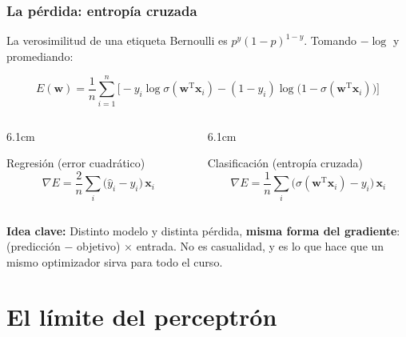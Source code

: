 \documentclass[aspectratio=169, 10pt]{beamer}
\newcommand{\formula}[1]{%
	\begin{tcolorbox}[colback=UCMBlue!8, colframe=UCMBlue, arc=4pt,
		boxsep=2pt, left=6pt, right=6pt, top=3pt, bottom=3pt]
		#1
	\end{tcolorbox}
}
\newcommand{\idea}[1]{%
	\begin{tcolorbox}[colback=AccentGreen!6, colframe=AccentGreen, arc=3pt,
		width=\textwidth, boxsep=1pt, left=5pt, right=5pt, top=2pt, bottom=2pt,
		fontupper=\small]
		\RaggedRight\textbf{Idea clave:} #1
	\end{tcolorbox}
}
\begin{document}
\begin{frame}
\frametitle{La pérdida: entropía cruzada}
La verosimilitud de una etiqueta Bernoulli es $p^{y}(1-p)^{1-y}$. Tomando $-\log$ y promediando:
\formula{
\[
E(\mathbf w) = \frac{1}{n}\sum_{i=1}^{n}
\Big[-y_i \log \sigma(\mathbf w^{\mathrm{T}}\mathbf x_i) - (1-y_i)\log\big(1-\sigma(\mathbf w^{\mathrm{T}}\mathbf x_i)\big)\Big]
\]}
\pause
\begin{columns}[T]
\begin{column}{6.1cm}
\begin{block}{Regresión (error cuadrático)}
\[
\nabla E = \frac{2}{n}\sum_i \big(\hat y_i - y_i\big)\,\mathbf x_i
\]
\end{block}
\end{column}
\begin{column}{6.1cm}
\begin{block}{Clasificación (entropía cruzada)}
\[
\nabla E = \frac{1}{n}\sum_i \big(\sigma(\mathbf w^{\mathrm{T}}\mathbf x_i) - y_i\big)\,\mathbf x_i
\]
\end{block}
\end{column}
\end{columns}
\vspace{0.4em}
\idea{Distinto modelo y distinta p\'erdida, \textbf{misma forma del gradiente}: (predicci\'on $-$ objetivo) $\times$ entrada. No es casualidad, y es lo que hace que un mismo optimizador sirva para todo el curso.}
\end{frame}

\section{El límite del perceptrón}
\end{document}
